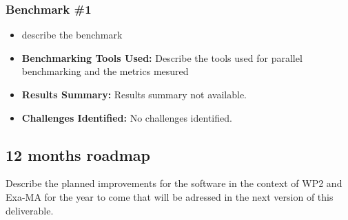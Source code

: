 \subsubsection{Benchmark \#1}
\begin{itemize}
    \item describe the benchmark
    \item \textbf{Benchmarking Tools Used:} Describe the tools used for parallel benchmarking and the metrics mesured
    \item \textbf{Results Summary:} Results summary not available.
    \item \textbf{Challenges Identified:} No challenges identified.
\end{itemize}

\subsection{12 months roadmap}
\label{sec:WP2:Scimba:roadmap}

Describe the planned improvements  for the software in the context of WP2 and Exa-MA for the year to come that will be adressed in the next version of this deliverable.